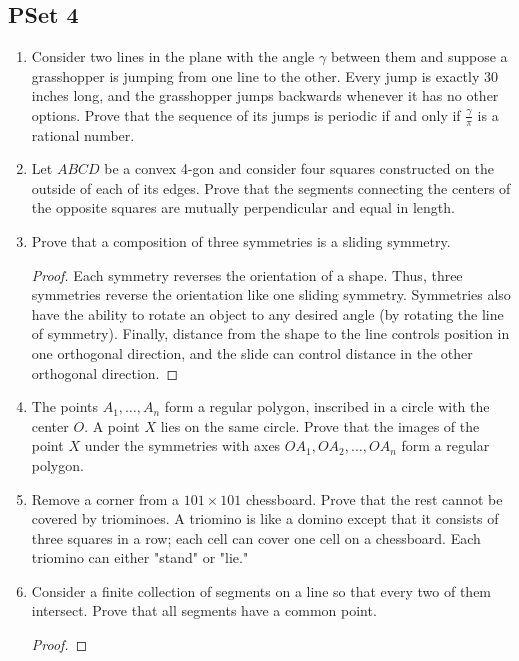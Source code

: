 \documentclass[../main.tex]{subfiles}
\begin{document}
\chapter{}
\section{PSet 4}
\begin{enumerate}
    \item {}Consider two lines in the plane with the angle $\gamma$ between them and suppose a grasshopper is jumping from one line to the other. Every jump is exactly 30 inches long, and the grasshopper jumps backwards whenever it has no other options. Prove that the sequence of its jumps is periodic if and only if $\frac{\gamma}{\pi}$ is a rational number.
    \item Let $ABCD$ be a convex 4-gon and consider four squares constructed on the outside of each of its edges. Prove that the segments connecting the centers of the opposite squares are mutually perpendicular and equal in length.
    \item Prove that a composition of three symmetries is a sliding symmetry.
    \begin{proof}
        Each symmetry reverses the orientation of a shape. Thus, three symmetries reverse the orientation like one sliding symmetry. Symmetries also have the ability to rotate an object to any desired angle (by rotating the line of symmetry). Finally, distance from the shape to the line controls position in one orthogonal direction, and the slide can control distance in the other orthogonal direction.
    \end{proof}
    \item The points $A_1,\dots,A_n$ form a regular polygon, inscribed in a circle with the center $O$. A point $X$ lies on the same circle. Prove that the images of the point $X$ under the symmetries with axes $OA_1,OA_2,\dots,OA_n$ form a regular polygon.
    \item Remove a corner from a $101\times 101$ chessboard. Prove that the rest cannot be covered by triominoes. A triomino is like a domino except that it consists of three squares in a row; each cell can cover one cell on a chessboard. Each triomino can either "stand" or "lie."
    \item Consider a finite collection of segments on a line so that every two of them intersect. Prove that all segments have a common point.
    \begin{proof}

\end{proof}
\end{enumerate}
\end{document}

